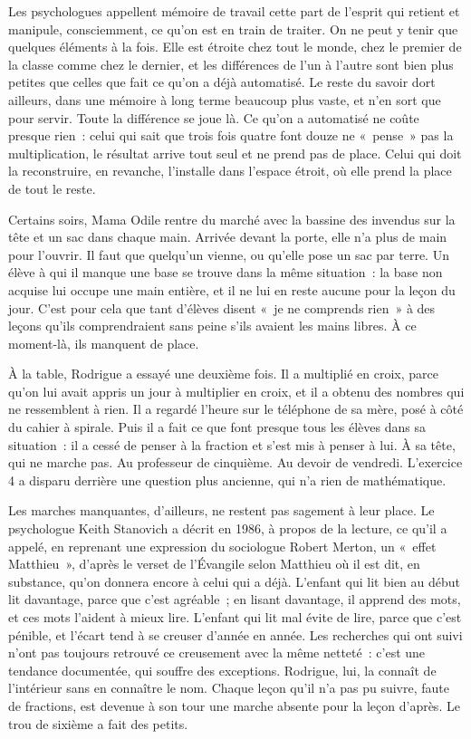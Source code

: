 \documentclass[10.5pt,twoside,openright]{book}
\begin{document}
Les psychologues appellent mémoire de travail cette part de l’esprit qui retient et manipule, consciemment, ce qu’on est en train de traiter. On ne peut y tenir que quelques éléments à la fois. Elle est étroite chez tout le monde, chez le premier de la classe comme chez le dernier, et les différences de l’un à l’autre sont bien plus petites que celles que fait ce qu’on a déjà automatisé. Le reste du savoir dort ailleurs, dans une mémoire à long terme beaucoup plus vaste, et n’en sort que pour servir. Toute la différence se joue là. Ce qu’on a automatisé ne coûte presque rien : celui qui sait que trois fois quatre font douze ne « pense » pas la multiplication, le résultat arrive tout seul et ne prend pas de place. Celui qui doit la reconstruire, en revanche, l’installe dans l’espace étroit, où elle prend la place de tout le reste.

Certains soirs, Mama Odile rentre du marché avec la bassine des invendus sur la tête et un sac dans chaque main. Arrivée devant la porte, elle n’a plus de main pour l’ouvrir. Il faut que quelqu’un vienne, ou qu’elle pose un sac par terre. Un élève à qui il manque une base se trouve dans la même situation : la base non acquise lui occupe une main entière, et il ne lui en reste aucune pour la leçon du jour. C’est pour cela que tant d’élèves disent « je ne comprends rien » à des leçons qu’ils comprendraient sans peine s’ils avaient les mains libres. À ce moment-là, ils manquent de place.

À la table, Rodrigue a essayé une deuxième fois. Il a multiplié en croix, parce qu’on lui avait appris un jour à multiplier en croix, et il a obtenu des nombres qui ne ressemblent à rien. Il a regardé l’heure sur le téléphone de sa mère, posé à côté du cahier à spirale. Puis il a fait ce que font presque tous les élèves dans sa situation : il a cessé de penser à la fraction et s’est mis à penser à lui. À sa tête, qui ne marche pas. Au professeur de cinquième. Au devoir de vendredi. L’exercice 4 a disparu derrière une question plus ancienne, qui n’a rien de mathématique.

Les marches manquantes, d’ailleurs, ne restent pas sagement à leur place. Le psychologue Keith Stanovich a décrit en 1986, à propos de la lecture, ce qu’il a appelé, en reprenant une expression du sociologue Robert Merton, un « effet Matthieu », d’après le verset de l’Évangile selon Matthieu où il est dit, en substance, qu’on donnera encore à celui qui a déjà. L’enfant qui lit bien au début lit davantage, parce que c’est agréable ; en lisant davantage, il apprend des mots, et ces mots l’aident à mieux lire. L’enfant qui lit mal évite de lire, parce que c’est pénible, et l’écart tend à se creuser d’année en année. Les recherches qui ont suivi n’ont pas toujours retrouvé ce creusement avec la même netteté : c’est une tendance documentée, qui souffre des exceptions. Rodrigue, lui, la connaît de l’intérieur sans en connaître le nom. Chaque leçon qu’il n’a pas pu suivre, faute de fractions, est devenue à son tour une marche absente pour la leçon d’après. Le trou de sixième a fait des petits.
\end{document}
